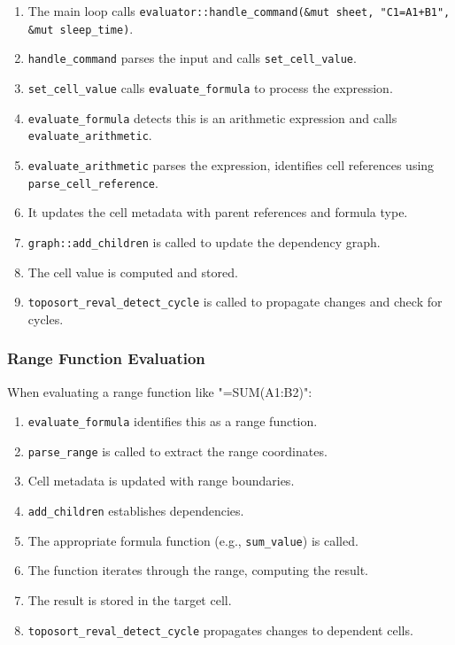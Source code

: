\documentclass[11pt,a4paper]{article}
\begin{document}
\begin{enumerate}
    \item The main loop calls \lstinline{evaluator::handle_command(&mut sheet, "C1=A1+B1", &mut sleep_time)}.
    \item \lstinline{handle_command} parses the input and calls \lstinline{set_cell_value}.
    \item \lstinline{set_cell_value} calls \lstinline{evaluate_formula} to process the expression.
    \item \lstinline{evaluate_formula} detects this is an arithmetic expression and calls \lstinline{evaluate_arithmetic}.
    \item \lstinline{evaluate_arithmetic} parses the expression, identifies cell references using \lstinline{parse_cell_reference}.
    \item It updates the cell metadata with parent references and formula type.
    \item \lstinline{graph::add_children} is called to update the dependency graph.
    \item The cell value is computed and stored.
    \item \lstinline{toposort_reval_detect_cycle} is called to propagate changes and check for cycles.
\end{enumerate}

\subsubsection{Range Function Evaluation}

When evaluating a range function like "=SUM(A1:B2)":

\begin{enumerate}
    \item \lstinline{evaluate_formula} identifies this as a range function.
    \item \lstinline{parse_range} is called to extract the range coordinates.
    \item Cell metadata is updated with range boundaries.
    \item \lstinline{add_children} establishes dependencies.
    \item The appropriate formula function (e.g., \lstinline{sum_value}) is called.
    \item The function iterates through the range, computing the result.
    \item The result is stored in the target cell.
    \item \lstinline{toposort_reval_detect_cycle} propagates changes to dependent cells.
\end{enumerate}
\end{document}
